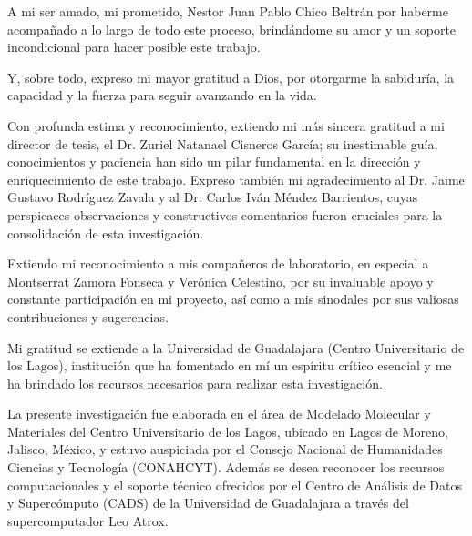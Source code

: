 \documentclass[12 pt, letter, oneside]{book}
\begin{document}
A mi ser amado, mi prometido, Nestor Juan Pablo Chico Beltrán por haberme acompañado a lo largo de todo este proceso, brindándome su amor y un soporte incondicional para hacer posible este trabajo.

Y, sobre todo, expreso mi mayor gratitud a Dios, por otorgarme la sabiduría, la capacidad y la fuerza para seguir avanzando en la vida. 

Con profunda estima y reconocimiento, extiendo mi más sincera gratitud a mi director de tesis, el Dr. Zuriel Natanael Cisneros García; su inestimable guía, conocimientos y paciencia han sido un pilar fundamental en la dirección y enriquecimiento de este trabajo. Expreso también mi agradecimiento al Dr. Jaime Gustavo Rodríguez Zavala y al Dr. Carlos Iván Méndez Barrientos, cuyas perspicaces observaciones y constructivos comentarios fueron cruciales para la consolidación de esta investigación.

Extiendo mi reconocimiento a mis compañeros de laboratorio, en especial a Montserrat Zamora Fonseca y Verónica Celestino, por su invaluable apoyo y constante participación en mi proyecto, así como a mis sinodales por sus valiosas contribuciones y sugerencias.

Mi gratitud se extiende a la Universidad de Guadalajara (Centro Universitario de los Lagos), institución que ha fomentado en mí un espíritu crítico esencial y me ha brindado los recursos necesarios para realizar esta investigación.

La presente investigación fue elaborada en el área de Modelado Molecular y Materiales del Centro Universitario de los Lagos, ubicado en Lagos de Moreno, Jalisco, México, y estuvo auspiciada por el Consejo Nacional de Humanidades Ciencias y Tecnología (CONAHCYT). Además se desea reconocer los recursos computacionales y el soporte técnico ofrecidos por el Centro de Análisis de Datos y Supercómputo (CADS) de la Universidad de Guadalajara a través del supercomputador Leo Atrox.

%

%
\newpage
\end{document}
